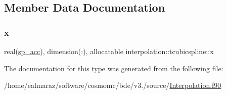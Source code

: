 \subsection{Member Data Documentation}
\mbox{\label{structinterpolation_1_1tcubicspline_a3ec1c46c2fe9e5a8ebd82edae749703e}} 
\subsubsection{\texorpdfstring{x}{x}}
{\footnotesize\ttfamily real(\mbox{\hyperlink{namespaceinterpolation_af72aa9a05feb8ef90b2d26e4a013abf3}{sp\+\_\+acc}}), dimension(\+:), allocatable interpolation\+::tcubicspline\+::x}



The documentation for this type was generated from the following file\+:\begin{DoxyCompactItemize}
\item 
/home/ealmaraz/software/cosmomc/bde/v3./source/\mbox{\hyperlink{Interpolation_8f90}{Interpolation.\+f90}}\end{DoxyCompactItemize}
